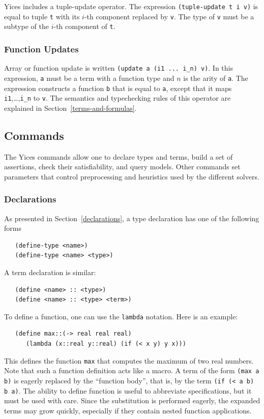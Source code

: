 \documentclass[11pt,twoside,fleqn,openright,titlepage]{cslreport}
\begin{document}
\medskip\noindent Yices includes a tuple-update operator. The expression
\texttt{(tuple-update t i v)} is equal to tuple \texttt{t} with its $i$-th
component replaced by \texttt{v}. The type of \texttt{v} must be a subtype of
the $i$-th component of \texttt{t}.

\subsubsection*{Function Updates}

Array or function update is written \texttt{(update a (i1 ... i\_n)
  v)}. In this expression, \texttt{a} must be a term with a function
type and $n$ is the arity of \texttt{a}. The expression constructs a
function \texttt{b} that is equal to \texttt{a}, except that it maps
\texttt{i1},\ldots,\texttt{i\_n} to \texttt{v}.  The semantics and
typechecking rules of this operator are explained in
Section~\ref{terms-and-formulas}.


\subsection{Commands}

The Yices commands allow one to  declare types and terms, build a set
of  assertions, check  their  satisfiability, and  query models.  Other
commands set parameters that control preprocessing and heuristics used
by the different solvers.

\subsubsection*{Declarations}

As presented in Section~\ref{declarations}, a type declaration has one
of the following forms
\begin{small}
\begin{verbatim}
   (define-type <name>)
   (define-type <name> <type>)
\end{verbatim}
\end{small}
A term declaration is similar:
\begin{small}
\begin{verbatim}
   (define <name> :: <type>)
   (define <name> :: <type> <term>)
\end{verbatim}
\end{small}
To define a function, one can use the \texttt{lambda} notation.  Here
is an example:
\begin{small}
\begin{verbatim}
   (define max::(-> real real real)
      (lambda (x::real y::real) (if (< x y) y x)))
\end{verbatim}
\end{small}
This defines the function \texttt{max} that computes the maximum of
two real numbers. Note that such a function definition acts like a
macro. A term of the form \texttt{(max a b)} is eagerly replaced by
the ``function body'', that is, by the term \texttt{(if (< a b) b a)}.
The ability to define function is useful to abbreviate specifications,
but it must be used with care. Since the substitution is performed
eagerly, the expanded terms may grow quickly, especially if they
contain nested function applications.
\end{document}
